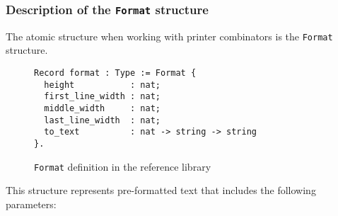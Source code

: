 \documentclass[14pt]{constructor-diploma}
\begin{document}

\subsubsection{Description of the \texttt{Format} structure}
The atomic structure when working with printer combinators is the \texttt{Format} structure. 
\begin{figure}[H]

\begin{mdframed}[backgroundcolor=bg]
\begin{verbatim}
Record format : Type := Format {
  height           : nat;
  first_line_width : nat;
  middle_width     : nat;
  last_line_width  : nat;
  to_text          : nat -> string -> string
}.
\end{verbatim}
\end{mdframed}
\caption{\texttt{Format} definition in the reference library~\cite{korolihin}}
\label{fig:format}
\end{figure}
This structure represents pre-formatted text that includes the following parameters:
\end{document}
